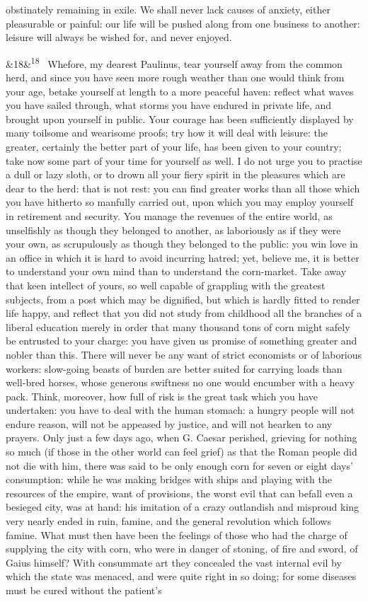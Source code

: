 \documentclass[12pt]{article}
\newcommand{\para}[1][]{\par\noindent\ifx&#1&\else\textsuperscript{\footnotesize #1}~\fi}
\begin{document}
obstinately remaining in exile. We shall never lack causes of anxiety, either pleasurable or painful: our life will be pushed along from one business to another: leisure will always be wished for, and never enjoyed.

\para[18] Whefore, my dearest Paulinus, tear yourself away from the common herd, and since you have seen more rough weather than one would think from your age, betake yourself at length to a more peaceful haven: reflect what waves you have sailed through, what storms you have endured in private life, and brought upon yourself in public. Your courage has been sufficiently displayed by many toilsome and wearisome proofs; try how it will deal with leisure: the greater, certainly the better part of your life, has been given to your country; take now some part of your time for yourself as well. I do not urge you to practise a dull or lazy sloth, or to drown all your fiery spirit in the pleasures which are dear to the herd: that is not rest: you can find greater works than all those which you have hitherto so manfully carried out, upon which you may employ yourself in retirement and security. You manage the revenues of the entire world, as unselfishly as though they belonged to another, as laboriously as if they were your own, as scrupulously as though they belonged to the public: you win love in an office in which it is hard to avoid incurring hatred; yet, believe me, it is better to understand your own mind than to understand the corn-market. Take away that keen intellect of yours, so well capable of grappling with the greatest subjects, from a post which may be dignified, but which is hardly fitted to render life happy, and reflect that you did not study from childhood all the branches of a liberal education merely in order that many thousand tons of corn might safely be entrusted to your charge: you have given us promise of something greater and nobler than this. There will never be any want of strict economists or of laborious workers: slow-going beasts of burden are better suited for carrying loads than well-bred horses, whose generous swiftness no one would encumber with a heavy pack. Think, moreover, how full of risk is the great task which you have undertaken: you have to deal with the human stomach: a hungry people will not endure reason, will not be appeased by justice, and will not hearken to any prayers. Only just a few days ago, when G. Caesar perished, grieving for nothing so much (if those in the other world can feel grief) as that the Roman people did not die with him, there was said to be only enough corn for seven or eight days’ consumption: while he was making bridges with ships and playing with the resources of the empire, want of provisions, the worst evil that can befall even a besieged city, was at hand: his imitation of a crazy outlandish and misproud king very nearly ended in ruin, famine, and the general revolution which follows famine. What must then have been the feelings of those who had the charge of supplying the city with corn, who were in danger of stoning, of fire and sword, of Gaius himself? With consummate art they concealed the vast internal evil by which the state was menaced, and were quite right in so doing; for some diseases must be cured without the patient’s 
\end{document}
